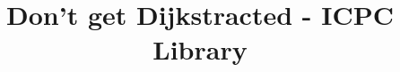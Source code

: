 \documentclass[10pt]{article}
\title{\vspace{-4ex}\Large{Don't get Dijkstracted - ICPC Library}}
\author{}
\date{}
\begin{document}
\begin{landscape}
\begin{multicols}{2}

\maketitle
\vspace{-13ex}
\tableofcontents
\pagestyle{fancy}



\end{multicols}
\end{landscape}
\end{document}
